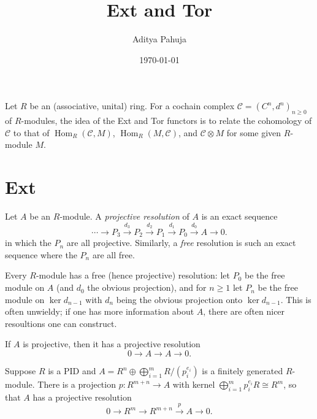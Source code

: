 \documentclass[10pt]{article}
\title{\vspace{-2.0cm}Ext and Tor}
\author{\large Aditya Pahuja}
\date{\large \today}
\providecommand{\opname}{\operatorname}
\providecommand{\vocab}[1]{{{\sffamily\textit{#1}}}}
\newcommand{\scr}[1]{\mathscr{#1}}
\renewcommand{\hom}{\opname{Hom}}
\newcommand{\tensor}{\otimes}
\newcommand{\dirsum}{\oplus}
\newcommand{\bigdirsum}{\bigoplus}
\newcommand{\longto}{\longrightarrow}
\begin{document}
\maketitle
\tableofcontents
\pagebreak

Let $R$ be an (associative, unital) ring.
For a cochain complex $\scr C = (C^n,d^n)_{n\ge 0}$ of $R$-modules,
the idea of the Ext and Tor functors is to relate
the cohomology of $\scr C$ to that of
$\hom_R(\scr C, M)$, $\hom_R(M,\scr C)$, and $\scr C\tensor M$
for some given $R$-module $M$.

\section{Ext}
\begin{definition}
    \label{def:resolutions}
    Let $A$ be an $R$-module. A \vocab{projective resolution} of $A$
    is an exact sequence
    \begin{equation*}
	\cdots\longrightarrow P_3\overset{d_3}\longrightarrow P_2\overset{d_2}\longrightarrow P_1
	\overset{d_1}\longrightarrow P_0\overset{d_0}\longrightarrow A\longrightarrow 0.
    \end{equation*}
    in which the $P_n$ are all projective.
    Similarly, a \vocab{free} resolution is such an exact sequence
    where the $P_n$ are all free.
\end{definition}

Every $R$-module has a free (hence projective) resolution:
let $P_0$ be the free module on $A$ (and $d_0$ the obvious projection),
and for $n\ge 1$ let $P_n$ be the free module on $\ker d_{n-1}$
with $d_n$ being the obvious projection onto $\ker d_{n-1}$.
This is often unwieldy; if one has more information about $A$,
there are often nicer resoultions one can construct.
\begin{example}
    If $A$ is projective, then it has a projective resolution
    \begin{equation*}
	0\longto A\longto A\longto 0.
    \end{equation*}
\end{example}

\begin{example}
    Suppose $R$ is a PID and $A = R^n \dirsum\bigdirsum_{i=1}^m R/(p_i^{e_i})$
    is a finitely generated $R$-module.
    There is a projection $p\colon R^{m+n}\to A$
    with kernel $\bigdirsum_{i=1}^m p_i^{e_i} R\cong R^{m}$,
    so that $A$ has a projective resolution
    \begin{equation*}
	0\longto R^{m}\longto R^{m+n}\overset p\longto A\longto 0.
    \end{equation*}
\end{example}
\end{document}
